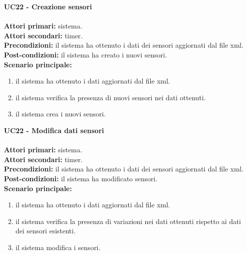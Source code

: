 \leavevmode\newline
\textbf{UC22 - Creazione sensori}
\\\\
\textbf{Attori primari:} sistema.
\\
\textbf{Attori secondari:} timer.
\\
\textbf{Precondizioni:} il sistema ha ottenuto i dati dei sensori aggiornati dal file \gls{xml}.
\\
\textbf{Post-condizioni:} il sistema ha creato i nuovi sensori.
\\
\textbf{Scenario principale:}
\begin{enumerate}
    \item il sistema ha ottenuto i dati aggiornati dal file \gls{xml}.
    \item il sistema verifica la presenza di nuovi sensori nei dati ottenuti.
    \item il sistema crea i nuovi sensori.
\end{enumerate}

\leavevmode\newline
\textbf{UC22 - Modifica dati sensori}
\\\\
\textbf{Attori primari:} sistema.
\\
\textbf{Attori secondari:} timer.
\\
\textbf{Precondizioni:} il sistema ha ottenuto i dati dei sensori aggiornati dal file \gls{xml}.
\\
\textbf{Post-condizioni:} il sistema ha modificato sensori.
\\
\textbf{Scenario principale:}
\begin{enumerate}
    \item il sistema ha ottenuto i dati aggiornati dal file \gls{xml}.
    \item il sistema verifica la presenza di variazioni nei dati ottenuti rispetto ai dati dei sensori esistenti.
    \item il sistema modifica i sensori.
\end{enumerate}
\clearpage
